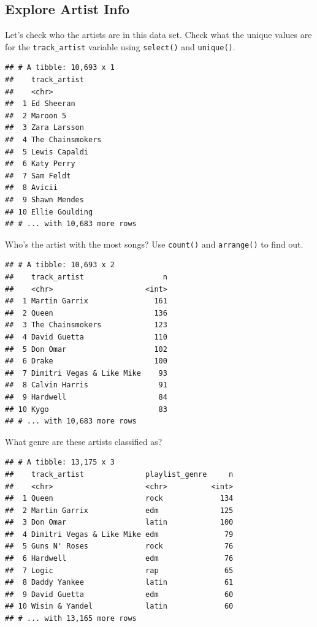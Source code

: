 \documentclass[
]{book}
\begin{document}
\hypertarget{explore-artist-info}{%
\subsection{Explore Artist Info}\label{explore-artist-info}}

Let's check who the artists are in this data set. Check what the unique values are for the \texttt{track\_artist} variable using \texttt{select()} and \texttt{unique()}.

\begin{verbatim}
## # A tibble: 10,693 x 1
##    track_artist    
##    <chr>           
##  1 Ed Sheeran      
##  2 Maroon 5        
##  3 Zara Larsson    
##  4 The Chainsmokers
##  5 Lewis Capaldi   
##  6 Katy Perry      
##  7 Sam Feldt       
##  8 Avicii          
##  9 Shawn Mendes    
## 10 Ellie Goulding  
## # ... with 10,683 more rows
\end{verbatim}

Who's the artist with the most songs? Use \texttt{count()} and \texttt{arrange()} to find out.

\begin{verbatim}
## # A tibble: 10,693 x 2
##    track_artist                  n
##    <chr>                     <int>
##  1 Martin Garrix               161
##  2 Queen                       136
##  3 The Chainsmokers            123
##  4 David Guetta                110
##  5 Don Omar                    102
##  6 Drake                       100
##  7 Dimitri Vegas & Like Mike    93
##  8 Calvin Harris                91
##  9 Hardwell                     84
## 10 Kygo                         83
## # ... with 10,683 more rows
\end{verbatim}

What genre are these artists classified as?

\begin{verbatim}
## # A tibble: 13,175 x 3
##    track_artist              playlist_genre     n
##    <chr>                     <chr>          <int>
##  1 Queen                     rock             134
##  2 Martin Garrix             edm              125
##  3 Don Omar                  latin            100
##  4 Dimitri Vegas & Like Mike edm               79
##  5 Guns N' Roses             rock              76
##  6 Hardwell                  edm               76
##  7 Logic                     rap               65
##  8 Daddy Yankee              latin             61
##  9 David Guetta              edm               60
## 10 Wisin & Yandel            latin             60
## # ... with 13,165 more rows
\end{verbatim}
\end{document}
